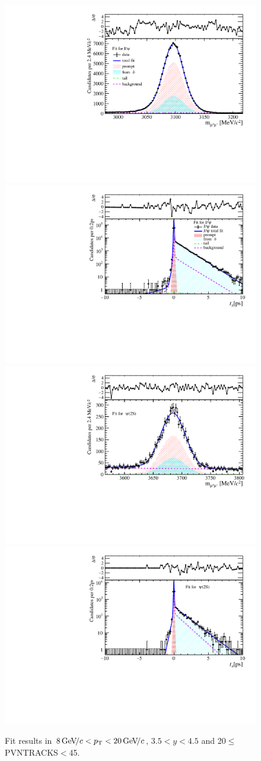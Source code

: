\begin{figure}[H]
\begin{center}
\includegraphics[width=0.47\linewidth]{pdf/Jpsi/drawmass/n2y3pt5.pdf}
\includegraphics[width=0.47\linewidth]{pdf/Jpsi/2DFit/n2y3pt5.pdf}
\vspace*{-0.5cm}
\includegraphics[width=0.47\linewidth]{pdf/Psi2S/drawmass/n2y3pt5.pdf}
\includegraphics[width=0.47\linewidth]{pdf/Psi2S/2DFit/n2y3pt5.pdf}
\vspace*{-0.5cm}
\end{center}
\caption{Fit results in $8\text{\,Ge\kern -0.1em V\!/}c<p_{\mathrm{T}}<20\text{\,Ge\kern -0.1em V\!/}c$, $3.5<y<4.5$ and 20$\leq$PVNTRACKS$<$45.}
\label{Fitn2y3pt5}
\end{figure}
